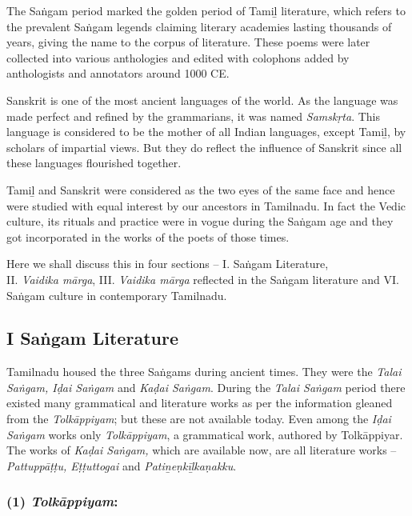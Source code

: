 The Saṅgam period marked the golden period of Tamiḻ literature, which refers to the prevalent Saṅgam legends claiming literary academies lasting thousands of years, giving the name to the corpus of literature. These poems were later collected into various anthologies and edited with colophons added by anthologists and annotators around 1000 CE.

Sanskrit is one of the most ancient languages of the world. As the language was made perfect and refined by the grammarians, it was named \textit{Samskṛta}. This language is considered to be the mother of all Indian languages, except Tamiḻ, by scholars of impartial views. But they do reflect the influence of Sanskrit since all these languages flourished together.

Tamiḻ and Sanskrit were considered as the two eyes of the same face and hence were studied with equal interest by our ancestors in Tamilnadu. In fact the Vedic culture, its rituals and practice were in vogue during the Saṅgam age and they got incorporated in the works of the poets of those times.

Here we shall discuss this in four sections – I. Saṅgam Literature,\\ II. \textit{Vaidika mārga}, III. \textit{Vaidika mārga} reflected in the Saṅgam literature and VI. Saṅgam culture in contemporary Tamilnadu.

\newpage

\subsection*{I Saṅgam Literature}

Tamilnadu housed the three Saṅgams during ancient times. They were the \textit{Talai Saṅgam, Iḍai Saṅgam} and \textit{Kaḍai Saṅgam}. During the \textit{Talai Saṅgam} period there existed many grammatical and literature works as per the information gleaned from the \textit{Tolkāppiyam}; but these are not available today. Even among the \textit{Iḍai Saṅgam} works only \textit{Tolkāppiyam}, a grammatical work, authored by Tolkāppiyar. The works of \textit{Kaḍai Saṅgam,} which are available now, are all literature works – \textit{Pattuppāṭṭu, Eṭṭuttogai} and \textit{Patiṉeṇkīḻkaṇakku}.

\subsubsection*{(1)\textit{ Tolkāppiyam}:}

\vskip -7pt

